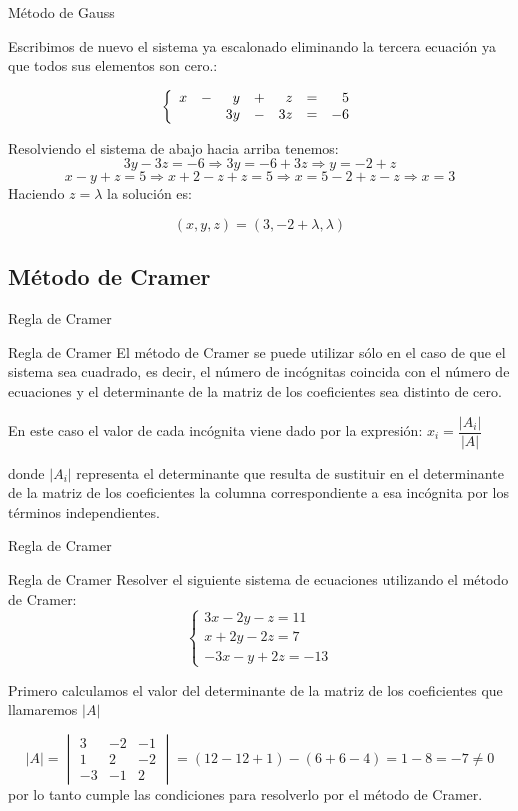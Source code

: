 \documentclass[9pt]{beamer}
\newenvironment{sistematres}{\left\lbrace \begin{array}{rrrrrrr}}{\end{array} \right.}
\begin{document}
\begin{frame}{Método de Gauss}

Escribimos de nuevo el sistema ya escalonado eliminando la tercera ecuación ya que todos sus elementos son cero.:

\[ 
	\begin{sistematres}
		x&-&y&+&z&=&5 \\
		&&3y&-&3z&=& -6\\
	\end{sistematres}
\]

\pause
Resolviendo el sistema de abajo hacia arriba tenemos:
\pause
\[ 3y-3z = -6  \Rightarrow 3y=-6+3z \Rightarrow y=-2+z  \]
\pause
\[ x-y+z=5 \Rightarrow x+2-z+z=5 \Rightarrow x=5-2+z-z \Rightarrow x=3 \]
\pause
Haciendo $z=\lambda $ la solución es:
\pause

\[ (x,y,z)=(3,-2+\lambda ,\lambda ) \] 	

\end{frame}


\subsection{Método de Cramer}
\begin{frame}{Regla de Cramer}
\begin{alertblock}{Regla de Cramer}
El método de Cramer se puede utilizar sólo en el caso de que el sistema sea cuadrado, es decir, el número de incógnitas coincida con el número de ecuaciones y el determinante de la matriz de los coeficientes sea distinto de cero.

En este caso el valor de cada incógnita viene dado por la expresión: $x_i=\dfrac{|A_i|}{|A|}$

donde $|A_i|$ representa el determinante que resulta de sustituir en el determinante de la matriz de los coeficientes la columna correspondiente a esa incógnita por los términos independientes.
\end{alertblock}
\end{frame}

\begin{frame}{Regla de Cramer}
\begin{exampleblock}{Regla de Cramer}
Resolver el siguiente sistema de ecuaciones utilizando el método de Cramer: 
\[ \begin{cases}
3x-2y-z=11 \\
x+2y-2z=7 \\
-3x-y+2z=-13
\end{cases} \]
\end{exampleblock}

\pause
Primero calculamos el valor del determinante de la matriz de los coeficientes que llamaremos $|A|$
\pause

\[ |A| =\begin{vmatrix}
3&	-2 & -1 \\
1 & 2 & -2 \\
-3&-1 & 2
\end{vmatrix}=(12-12+1)-(6+6-4)=1-8=-7 \neq 0 \]
por lo tanto cumple las condiciones para  resolverlo por el método de Cramer.
\end{frame}
\end{document}
